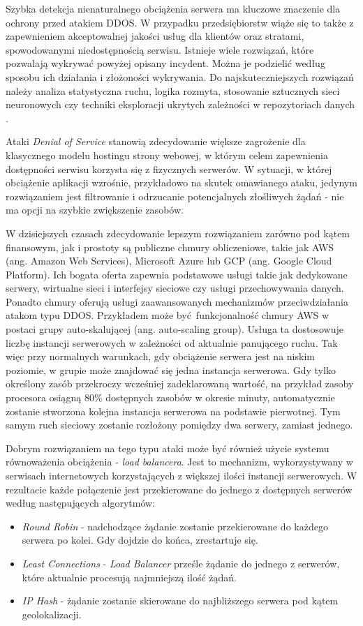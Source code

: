 \documentclass[12pt,twoside]{article}
\begin{document}
Szybka detekcja nienaturalnego obciążenia serwera ma kluczowe znaczenie dla ochrony przed atakiem DDOS. W przypadku przedsiębiorstw wiąże się to także z zapewnieniem akceptowalnej jakości usług dla klientów oraz stratami, spowodowanymi niedostępnością serwisu. Istnieje wiele rozwiązań, które pozwalają wykrywać powyżej opisany incydent. Można je podzielić według sposobu ich działania i złożoności wykrywania. Do najskuteczniejszych rozwiązań należy analiza statystyczna ruchu, logika rozmyta, stosowanie sztucznych sieci neuronowych czy techniki eksploracji ukrytych zależności w repozytoriach danych \cite{DDosDetection}. 

Ataki \emph{Denial of Service} stanowią zdecydowanie większe zagrożenie dla klasycznego modelu hostingu strony webowej, w którym celem zapewnienia dostępności serwisu korzysta się z fizycznych serwerów. W sytuacji, w której obciążenie aplikacji wzrośnie, przykładowo na skutek omawianego ataku, jedynym rozwiązaniem jest filtrowanie i odrzucanie potencjalnych złośliwych żądań - nie ma opcji na szybkie zwiększenie zasobów. 

W dzisiejszych czasach zdecydowanie lepszym rozwiązaniem zarówno pod kątem finansowym, jak i prostoty są publiczne chmury obliczeniowe, takie jak AWS (ang. Amazon Web Services), Microsoft Azure lub GCP (ang. Google Cloud Platform). Ich bogata oferta zapewnia podstawowe usługi takie jak dedykowane serwery, wirtualne sieci i interfejsy sieciowe czy usługi przechowywania danych. Ponadto chmury oferują usługi zaawansowanych mechanizmów przeciwdziałania atakom typu DDOS. Przykładem może być funkcjonalność chmury AWS w postaci grupy auto-skalującej (ang. auto-scaling group). Usługa ta dostosowuje liczbę instancji serwerowych w zależności od aktualnie panującego ruchu. Tak więc przy normalnych warunkach, gdy obciążenie serwera jest na niskim poziomie, w grupie może znajdować się jedna instancja serwerowa. Gdy tylko określony zasób przekroczy wcześniej zadeklarowaną wartość, na przykład zasoby procesora osiągną 80\% dostępnych zasobów w okresie minuty, automatycznie zostanie stworzona kolejna instancja serwerowa na podstawie pierwotnej. Tym samym ruch sieciowy zostanie rozłożony pomiędzy dwa serwery, zamiast jednego. 

Dobrym rozwiązaniem na tego typu ataki może być również użycie systemu równoważenia obciążenia - \emph{load balancera}. Jest to mechanizm, wykorzystywany w serwisach internetowych korzystających z większej ilości instancji serwerowych. W rezultacie każde połączenie jest przekierowane do jednego z dostępnych serwerów według następujących algorytmów:
\begin{itemize}
	\item \emph{Round Robin} - nadchodzące żądanie zostanie przekierowane do każdego serwera po kolei. Gdy dojdzie do końca, zrestartuje się.
	\item \emph{Least Connections} - \emph{Load Balancer} prześle żądanie do jednego z serwerów, które aktualnie procesują najmniejszą ilość żądań.
	\item \emph{IP Hash} - żądanie zostanie skierowane do najbliższego serwera pod kątem geolokalizacji. 
\end{itemize}
\end{document}
